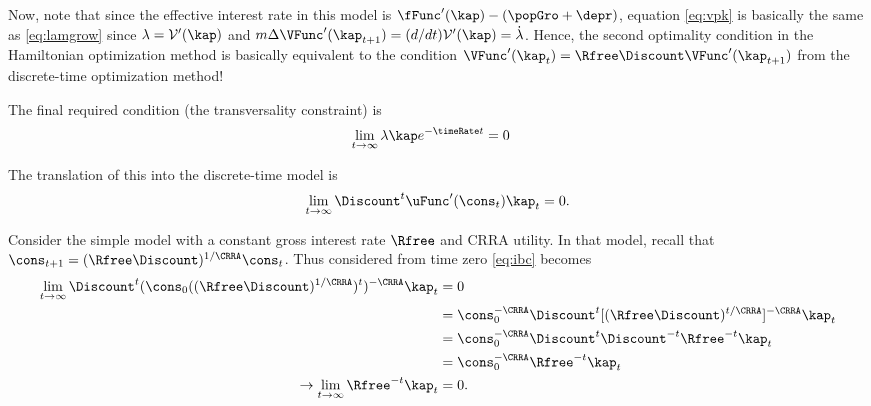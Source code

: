 \documentclass{handout}
\begin{document}

Now, note that since the effective interest rate in this model is 
$\fFunc^{\prime}(\kap)-(\popGro+\depr)$, equation \eqref{eq:vpk} is basically the same as 
\eqref{eq:lamgrow} since $\lambda = \mathcal{V}'(\kap)$ and $m \Delta 
\VFunc^{\prime}(\kap_{t+1}) = (d/dt)\mathcal{V}'(\kap) = \dot{\lambda}$.  Hence, the 
second optimality condition in the Hamiltonian optimization method is 
basically equivalent to the condition $\VFunc^{\prime}(\kap_{t})=\Rfree\Discount \VFunc^{\prime}(\kap_{t+1})$ 
from the discrete-time optimization method!

The final required condition (the transversality constraint) 
is
\begin{equation}\begin{gathered}\begin{aligned}
        \lim_{t \rightarrow \infty} \lambda \kap e^{-\timeRate t}& =  0 
\end{aligned}\end{gathered}\end{equation}

The translation of this into the discrete-time model is 
\begin{equation}
        \lim_{t \rightarrow \infty} \Discount^{t} \uFunc^{\prime}(\cons_{t}) \kap_{t} = 0.  \label{eq:ibc}
\end{equation}

Consider the simple model with a constant gross interest rate $\Rfree$ and CRRA 
utility.  In that model, recall that $\cons_{t+1}= (\Rfree\Discount)^{1/\CRRA} 
\cons_{t}$.  Thus considered from time zero \eqref{eq:ibc} becomes
\begin{equation}\begin{gathered}\begin{aligned}
        \lim_{t \rightarrow \infty} \Discount^{t} (\cons_{0} ((\Rfree\Discount)^{1/\CRRA})^{t})^{-\CRRA} \kap_{t} & =  0
\\  & =  \cons_{0}^{-\CRRA} \Discount^{t}[(\Rfree\Discount)^{t/\CRRA}]^{-\CRRA} \kap_{t}
\\  & =  \cons_{0}^{-\CRRA} \Discount^{t} \Discount^{-t} \Rfree^{-t} \kap_{t}
\\  & =  \cons_{0}^{-\CRRA} \Rfree^{-t} \kap_{t}
\\ \rightarrow \lim_{t \rightarrow \infty} \Rfree^{-t} \kap_{t} & =  0
.
\end{aligned}\end{gathered}\end{equation}
\end{document}
